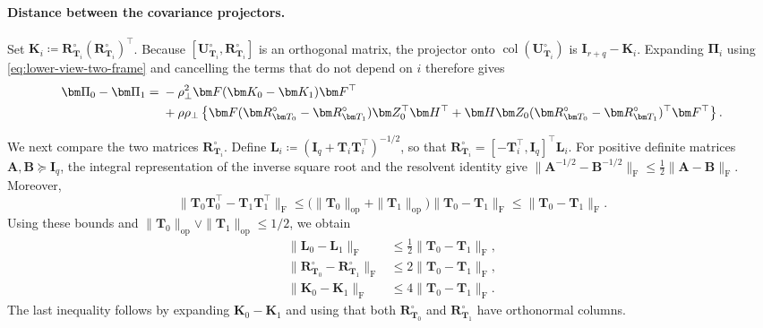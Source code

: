 \documentclass[11pt]{article}
\newcommand{\trans}{\top}
\begin{document}
\paragraph{Distance between the covariance projectors.}
Set
$\bm K_i\coloneqq
\bm R_{\bm T_i}^{\circ}
(\bm R_{\bm T_i}^{\circ})^\trans$.
Because
$[\bm U_{\bm T_i}^{\circ},\bm R_{\bm T_i}^{\circ}]$
is an orthogonal matrix, the projector onto
$\operatorname{col}(\bm U_{\bm T_i}^{\circ})$ is
$\bm I_{r+q}-\bm K_i$.  Expanding $\bm\Pi_i$ using
\cref{eq:lower-view-two-frame} and cancelling the terms that do not depend
on $i$ therefore gives
\begin{align}
  \bm\Pi_0-\bm\Pi_1
  ={}&
  -\rho_\perp^2
  \bm F(\bm K_0-\bm K_1)\bm F^\trans
  \notag\\
  &+
  \rho\rho_\perp
  \left\{
    \bm F
    (\bm R_{\bm T_0}^{\circ}-\bm R_{\bm T_1}^{\circ})
    \bm Z_0^\trans\bm H^\trans
    +
    \bm H\bm Z_0
    (\bm R_{\bm T_0}^{\circ}-\bm R_{\bm T_1}^{\circ})^\trans
    \bm F^\trans
  \right\}.
\label{eq:lower-regular-projector-difference}
\end{align}

We next compare the two matrices
$\bm R_{\bm T_i}^{\circ}$.  Define
$\bm L_i\coloneqq
(\bm I_q+\bm T_i\bm T_i^\trans)^{-1/2}$, so that
$\bm R_{\bm T_i}^{\circ}
=[-\bm T_i^\trans,\bm I_q]^\trans\bm L_i$.
For positive definite matrices $\bm A,\bm B\succeq\bm I_q$, the integral
representation of the inverse square root and the resolvent identity give
\(\|\bm A^{-1/2}-\bm B^{-1/2}\|_{\mathrm F}
\le \frac12\|\bm A-\bm B\|_{\mathrm F}\).  Moreover,
\[
  \|\bm T_0\bm T_0^\trans-\bm T_1\bm T_1^\trans\|_{\mathrm F}
  \le
  \bigl(
    \|\bm T_0\|_{\mathrm{op}}
    +
    \|\bm T_1\|_{\mathrm{op}}
  \bigr)
  \|\bm T_0-\bm T_1\|_{\mathrm F}
  \le
  \|\bm T_0-\bm T_1\|_{\mathrm F}.
\]
Using these bounds and
$\|\bm T_0\|_{\mathrm{op}}\vee\|\bm T_1\|_{\mathrm{op}}\le1/2$, we obtain
\begin{equation}
\begin{aligned}
  \|\bm L_0-\bm L_1\|_{\mathrm F}
  &\le
  \frac12\|\bm T_0-\bm T_1\|_{\mathrm F},\\
  \|\bm R_{\bm T_0}^{\circ}
      -\bm R_{\bm T_1}^{\circ}\|_{\mathrm F}
  &\le
  2\|\bm T_0-\bm T_1\|_{\mathrm F},\\
  \|\bm K_0-\bm K_1\|_{\mathrm F}
  &\le
  4\|\bm T_0-\bm T_1\|_{\mathrm F}.
\end{aligned}
\label{eq:lower-regular-frame-bounds}
\end{equation}
The last inequality follows by expanding
$\bm K_0-\bm K_1$ and using that both
$\bm R_{\bm T_0}^{\circ}$ and
$\bm R_{\bm T_1}^{\circ}$ have orthonormal columns.
\end{document}
